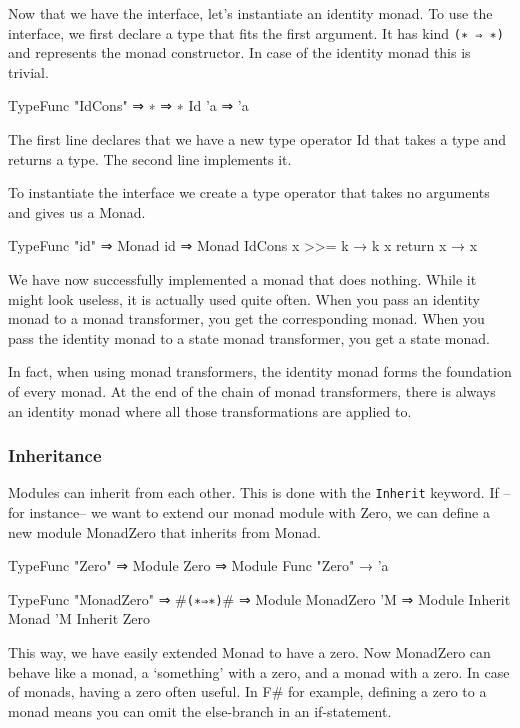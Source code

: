 Now that we have the interface, let's instantiate an identity monad.
To use the interface, we first declare a type that fits the first argument.
It has kind \verb|(∗ ⇒ ∗)| and represents the monad constructor.
In case of the identity monad this is trivial.

\begin{code}
  TypeFunc "IdCons" ⇒ ∗ ⇒ ∗
  Id 'a ⇒ 'a
\end{code}

The first line declares that we have a new type operator Id that takes a type and returns a type.
The second line implements it. 

To instantiate the interface we create a type operator that takes no arguments and gives us a Monad.

\begin{code}
  TypeFunc "id" ⇒ Monad 
  id ⇒ Monad IdCons {
    x >>= k → k x
    return x → x
  }
\end{code}

We have now successfully implemented a monad that does nothing.
While it might look useless, it is actually used quite often.
When you pass an identity monad to a monad transformer, you get the corresponding monad.
When you pass the identity monad to a state monad transformer, you get a state monad.

In fact, when using monad transformers, the identity monad forms the foundation of every monad.
At the end of the chain of monad transformers, there is always an identity monad where all those transformations are applied to.

\subsubsection*{Inheritance}
Modules can inherit from each other.
This is done with the \verb|Inherit| keyword. 
If --for instance-- we want to extend our monad module with Zero,
we can define a new module MonadZero that inherits from Monad.

\begin{code}
  TypeFunc "Zero" ⇒ Module
  Zero ⇒ Module {
    Func "Zero" → 'a
  }

  TypeFunc "MonadZero" ⇒ #\verb|(∗⇒∗)|# ⇒ Module
  MonadZero 'M ⇒ Module {
    Inherit Monad 'M
    Inherit Zero
  }
\end{code}

This way, we have easily extended Monad to have a zero.
Now MonadZero can behave like a monad, a `something' with a zero, and a monad with a zero.
In case of monads, having a zero often useful.
In F\# for example, defining a zero to a monad means you can omit the else-branch in an if-statement.
